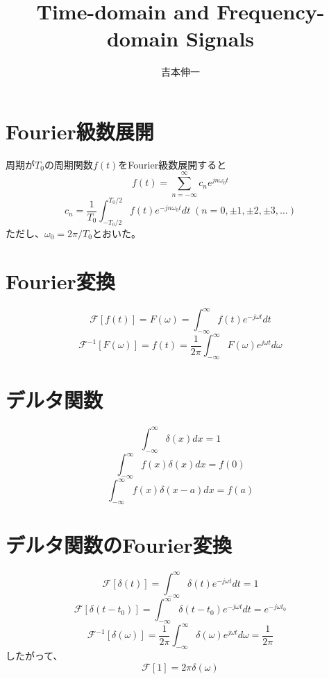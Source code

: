 \documentclass[]{jlreq}
\theoremstyle{definition}
\begin{document}
\title{Time-domain and Frequency-domain Signals}
\author{吉本伸一}
\maketitle
\tableofcontents
\clearpage

\section{Fourier級数展開}
周期が$T_0$の周期関数$f(t)$をFourier級数展開すると
%
\begin{equation}
  f(t) = \sum_{n=-\infty}^{\infty} c_n e^{j n \omega_0 t}
\end{equation}
%
\begin{equation}
  c_n = \frac{1}{T_0} \int_{-T_0/2}^{T_0/2} f(t) e^{- j n \omega_0 t} dt　\; (n = 0, \pm 1, \pm 2, \pm 3, \dots)
\end{equation}
%
ただし、$\omega_0 = 2\pi/T_0$とおいた。
%
\section{Fourier変換}
\begin{equation}
  \mathcal{F}[f(t)] = F(\omega) = \int_{-\infty}^{\infty} f(t) e^{-j\omega t} dt
\end{equation}
\begin{equation}
  \mathcal{F}^{-1}[F(\omega)] = f(t) = \frac{1}{2\pi}\int_{-\infty}^{\infty} F(\omega) e^{j\omega t} d\omega
\end{equation}

\section{デルタ関数}
\begin{equation}
  \int_{-\infty}^{\infty} \delta (x) dx = 1
\end{equation}
%
\begin{equation}
  \int_{-\infty}^{\infty} f(x) \delta (x) dx = f(0)
\end{equation}
%
\begin{equation}
  \int_{-\infty}^{\infty} f(x) \delta (x - a) dx = f(a)
\end{equation}
%
\section{デルタ関数のFourier変換}
%
\begin{equation}
  \mathcal{F}[\delta (t)] = \int_{-\infty}^{\infty} \delta (t) e^{- j \omega t} dt = 1 
\end{equation}
%
\begin{equation}
  \mathcal{F}[\delta (t - t_0)] = \int_{-\infty}^{\infty} \delta (t - t_0) e^{- j \omega t} dt = e^{-j \omega t_0}
  \label{fd2}
\end{equation}
%
\begin{equation}
  \mathcal{F}^{-1} [\delta(\omega)] = \frac{1}{2\pi}\int_{-\infty}^{\infty} \delta (\omega) e^{j \omega t } d\omega = \frac{1}{2\pi}
\end{equation}
%
したがって、
%
\begin{equation}
  \mathcal{F}[1] = 2\pi\delta(\omega)
\end{equation}
%
\end{document}
